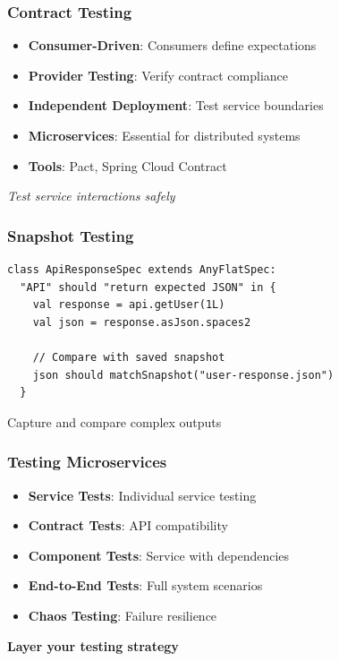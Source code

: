 \documentclass{beamer}
\begin{document}
\begin{frame}
\frametitle{Contract Testing}

\begin{itemize}
  \item \textbf{Consumer-Driven}: Consumers define expectations
  \item \textbf{Provider Testing}: Verify contract compliance
  \item \textbf{Independent Deployment}: Test service boundaries
  \item \textbf{Microservices}: Essential for distributed systems
  \item \textbf{Tools}: Pact, Spring Cloud Contract
\end{itemize}

\vspace{0.3cm}
\textit{Test service interactions safely}

\end{frame}

\begin{frame}[fragile]
\frametitle{Snapshot Testing}

\begin{lstlisting}[style=scalaStyle]
class ApiResponseSpec extends AnyFlatSpec:
  "API" should "return expected JSON" in {
    val response = api.getUser(1L)
    val json = response.asJson.spaces2
    
    // Compare with saved snapshot
    json should matchSnapshot("user-response.json")
  }
\end{lstlisting}

Capture and compare complex outputs

\end{frame}

\begin{frame}
\frametitle{Testing Microservices}

\begin{itemize}
  \item \textbf{Service Tests}: Individual service testing
  \item \textbf{Contract Tests}: API compatibility
  \item \textbf{Component Tests}: Service with dependencies
  \item \textbf{End-to-End Tests}: Full system scenarios
  \item \textbf{Chaos Testing}: Failure resilience
\end{itemize}

\vspace{0.3cm}
\textbf{Layer your testing strategy}

\end{frame}
\end{document}
